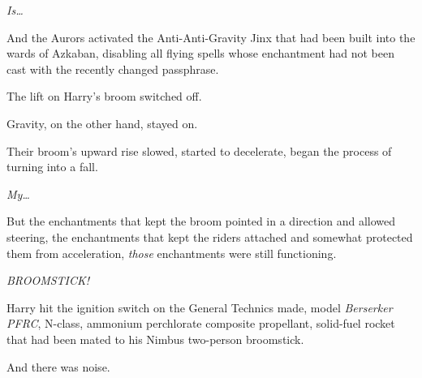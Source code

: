 \emph{Is…}

And the Aurors activated the Anti-Anti-Gravity Jinx that had been built into the wards of Azkaban, disabling all flying spells whose enchantment had not been cast with the recently changed passphrase.

The lift on Harry’s broom switched off.

Gravity, on the other hand, stayed on.

Their broom’s upward rise slowed, started to decelerate, began the process of turning into a fall.

\emph{My…}

But the enchantments that kept the broom pointed in a direction and allowed steering, the enchantments that kept the riders attached and somewhat protected them from acceleration, \emph{those} enchantments were still functioning.

\emph{BROOMSTICK!}

Harry hit the ignition switch on the General Technics made, model \emph{Berserker PFRC}, N-class, ammonium perchlorate composite propellant, solid-fuel rocket that had been mated to his Nimbus  two-person broomstick.

And there was noise.
